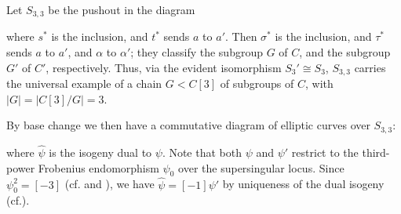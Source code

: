 \documentclass{gtpart}
\theoremstyle{definition}
\theoremstyle{remark}
\newcommand{\cff}[2]{cf.\thinspace{\cite[#1]{#2}}}
\newcommand{\A}{\alpha}
\begin{document}
Let $S_{3,3}$ be the pushout in the diagram 
\begin{center}
\end{center}
where $s^*$ is the inclusion, and $t^*$ sends $a$ to $a'$.  
Then $\sigma^*$ is the inclusion, and $\tau^*$ sends $a$ to $a'$, and $\A$ to $\A'$; 
they classify the subgroup $G$ of $C$, and the subgroup $G'$ of $C'$, respectively.  
Thus, via the evident isomorphism $S_3' \cong S_3$, 
$S_{3,3}$ carries the universal example of a chain $G < C[3]$ of subgroups of $C$, 
with $|G| = |C[3]/G| = 3$.  

By base change we then have a commutative diagram of elliptic curves over $S_{3,3}$: 
\begin{center}
\end{center}
where $\widehat{\psi}$ is the isogeny dual to $\psi$.  
Note that both $\psi$ and $\psi'$ restrict to the third-power Frobenius endomorphism $\psi_0$ over the supersingular locus.  
Since $\psi_0^2 = [-3]$ (\cff{5.11}{Y} and \cite[V.2.3.1]{AEC}), 
we have $\widehat{\psi} = [-1] \psi'$ by uniqueness of the dual isogeny (\cff{III.6.1a}{AEC}).  
\end{document}
